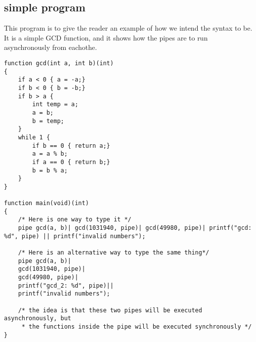 \documentclass[11pt]{article}
\begin{document}
\subsection{simple program}
This program is to give the reader an example of how we intend the syntax to be. It is a simple GCD function, and it shows how the pipes are to run asynchronously from eachothe.
\begin{lstlisting}
function gcd(int a, int b)(int)
{
	if a < 0 { a = -a;}
	if b < 0 { b = -b;}
	if b > a {
		int temp = a;
		a = b;
		b = temp;
	}
	while 1 {
		if b == 0 { return a;}
		a = a % b;
		if a == 0 { return b;}
		b = b % a;
	}
}

function main(void)(int)
{
	/* Here is one way to type it */
	pipe gcd(a, b)| gcd(1031940, pipe)| gcd(49980, pipe)| printf("gcd: %d", pipe) || printf("invalid numbers");
	
	/* Here is an alternative way to type the same thing*/
	pipe gcd(a, b)|
	gcd(1031940, pipe)|
	gcd(49980, pipe)|
	printf("gcd_2: %d", pipe)||
	printf("invalid numbers");

	/* the idea is that these two pipes will be executed asynchronously, but
	 * the functions inside the pipe will be executed synchronously */
}

\end{lstlisting}
\begin{comment}
\subsection{Simple Server Example}
This example is to give the reader an example of how Pipeline can used for web developement.
\begin{lstlisting}
/* assuming listen, and reply are already defined socket api
 * and that stripe has an api for Pipeline*/
function main()(int)
{
	while (1) {
		listen(80)|
		stripe.charges.create({
			"amount": 1000,
			"currency": "usd",
			"description": "Example charge",
			"source": token,})|
			reply(pipe); /*assumes stripe.charges.create returns
			              *everything needed for the reply */
	}
	
	listen(80)|
	stripe.charges.create({
		"amount": 1000,
		"currency": "usd",
		"description": "Example charge",
		"source": token,})|
	goback(8)||
	perror("pipe failed");
	
}	
\end{lstlisting}
\end{comment}

\end{document}

